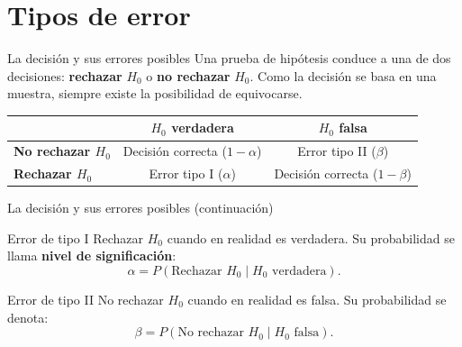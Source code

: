\documentclass[aspectratio=169,11pt]{beamer}
\begin{document}
\section{Tipos de error}

\begin{frame}{La decisión y sus errores posibles}
Una prueba de hipótesis conduce a una de dos decisiones: \textbf{rechazar} $H_0$ o \textbf{no rechazar} $H_0$. Como la decisión se basa en una muestra, siempre existe la posibilidad de equivocarse.

\begin{table}[]
\centering
\begin{tabular}{@{}lcc@{}}
\toprule
 & $H_0$ verdadera & $H_0$ falsa \\
\midrule
\textbf{No rechazar $H_0$} & Decisión correcta ($1-\alpha$) & Error tipo II ($\beta$) \\
\textbf{Rechazar $H_0$} & Error tipo I ($\alpha$) & Decisión correcta ($1-\beta$) \\
\bottomrule
\end{tabular}
\end{table}

\end{frame}

\begin{frame}{La decisión y sus errores posibles (continuación)}
\begin{block}{Error de tipo I}
Rechazar $H_0$ cuando en realidad es verdadera. Su probabilidad se llama \textbf{nivel de significación}:
\[
\alpha = P(\text{Rechazar } H_0 \mid H_0 \text{ verdadera}).
\]
\end{block}

\begin{block}{Error de tipo II}
No rechazar $H_0$ cuando en realidad es falsa. Su probabilidad se denota:
\[
\beta = P(\text{No rechazar } H_0 \mid H_0 \text{ falsa}).
\]
\end{block}
\end{frame}
\end{document}
